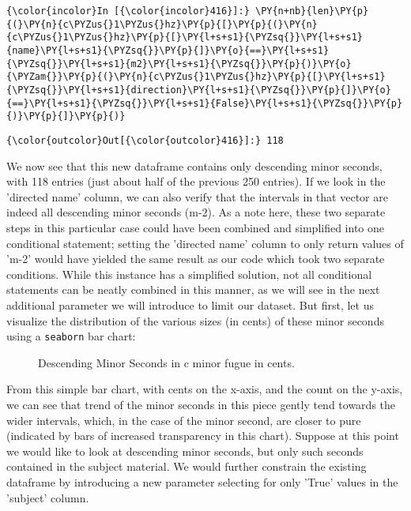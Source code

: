     \begin{Verbatim}[commandchars=\\\{\}]
{\color{incolor}In [{\color{incolor}416}]:} \PY{n+nb}{len}\PY{p}{(}\PY{n}{c\PYZus{}1\PYZus{}hz}\PY{p}{[}\PY{p}{(}\PY{n}{c\PYZus{}1\PYZus{}hz}\PY{p}{[}\PY{l+s+s1}{\PYZsq{}}\PY{l+s+s1}{name}\PY{l+s+s1}{\PYZsq{}}\PY{p}{]}\PY{o}{==}\PY{l+s+s1}{\PYZsq{}}\PY{l+s+s1}{m2}\PY{l+s+s1}{\PYZsq{}}\PY{p}{)}\PY{o}{\PYZam{}}\PY{p}{(}\PY{n}{c\PYZus{}1\PYZus{}hz}\PY{p}{[}\PY{l+s+s1}{\PYZsq{}}\PY{l+s+s1}{direction}\PY{l+s+s1}{\PYZsq{}}\PY{p}{]}\PY{o}{==}\PY{l+s+s1}{\PYZsq{}}\PY{l+s+s1}{False}\PY{l+s+s1}{\PYZsq{}}\PY{p}{)}\PY{p}{]}\PY{p}{)}
\end{Verbatim}
\begin{Verbatim}[commandchars=\\\{\}]
{\color{outcolor}Out[{\color{outcolor}416}]:} 118
\end{Verbatim}
    We now see that this new dataframe contains only descending minor
seconds, with 118 entries (just about half of the previous 250 entries).
If we look in the 'directed name' column, we can also verify that the
intervals in that vector are indeed all descending minor seconds (m-2).
As a note here, these two separate steps in this particular case could
have been combined and simplified into one conditional statement;
setting the 'directed name' column to only return values of 'm-2' would
have yielded the same result as our code which took two separate
conditions. While this instance has a simplified solution, not all
conditional statements can be neatly combined in this manner, as we will
see in the next additional parameter we will introduce to limit our
dataset. But first, let us visualize the distribution of the various
sizes (in cents) of these minor seconds using a \texttt{seaborn} bar
chart:




\begin{figure}[H]
\vspace{1.5em}
    \centering
    \caption{ Descending Minor Seconds in c minor fugue in cents. }
\end{figure}    From this simple bar chart, with cents on the x-axis, and the count on
the y-axis, we can see that trend of the minor seconds in this piece
gently tend towards the wider intervals, which, in the case of the minor
second, are closer to pure (indicated by bars of increased transparency
in this chart). Suppose at this point we would like to look at
descending minor seconds, but only such seconds contained in the subject
material. We would further constrain the existing dataframe by
introducing a new parameter selecting for only 'True' values in the
'subject' column.

